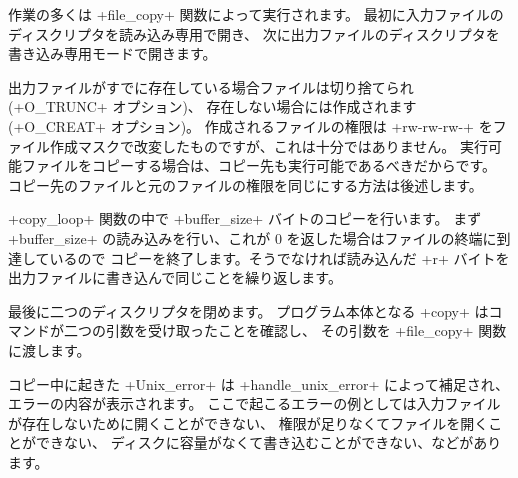 作業の多くは \ml+file_copy+ 関数によって実行されます。
最初に入力ファイルのディスクリプタを読み込み専用で開き、
次に出力ファイルのディスクリプタを書き込み専用モードで開きます。

出力ファイルがすでに存在している場合ファイルは切り捨てられ (\ml+O_TRUNC+ オプション)、
存在しない場合には作成されます (\ml+O_CREAT+ オプション)。
作成されるファイルの権限は \ml+rw-rw-rw-+ をファイル作成マスクで改変したものですが、これは十分ではありません。
実行可能ファイルをコピーする場合は、コピー先も実行可能であるべきだからです。
コピー先のファイルと元のファイルの権限を同じにする方法は後述します。

\ml+copy_loop+ 関数の中で \ml+buffer_size+ バイトのコピーを行います。
まず\ml+buffer_size+ の読み込みを行い、これが 0 を返した場合はファイルの終端に到達しているので
コピーを終了します。そうでなければ読み込んだ \ml+r+ バイトを出力ファイルに書き込んで同じことを繰り返します。

最後に二つのディスクリプタを閉めます。
プログラム本体となる \ml+copy+ はコマンドが二つの引数を受け取ったことを確認し、
その引数を \ml+file_copy+ 関数に渡します。

コピー中に起きた \ml+Unix_error+ は
\ml+handle_unix_error+ によって補足され、エラーの内容が表示されます。
ここで起こるエラーの例としては入力ファイルが存在しないために開くことができない、
権限が足りなくてファイルを開くことができない、
ディスクに容量がなくて書き込むことができない、などがあります。


